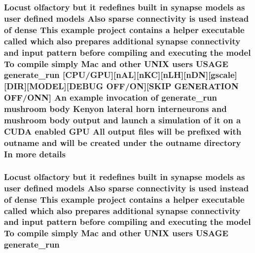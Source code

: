 \hypertarget{userproject_2MBody__userdef__project_2README_8txt_a8a530a3a68382c4ca5a4e7fe605b81b0}{
\subsubsection[{details}]{\setlength{\rightskip}{0pt plus 5cm}Locust olfactory but {\bf it} redefines built {\bf in} synapse models as user defined models Also sparse connectivity {\bf is} used instead of dense This example {\bf project} contains a helper executable called which also prepares additional synapse connectivity and input pattern before compiling and executing the {\bf model} To compile simply Mac and other U\+N\+I\+X users U\+S\+A\+G\+E {\bf generate\+\_\+run} \mbox{[}{\bf C\+P\+U}/{\bf G\+P\+U}\mbox{]}\mbox{[}n\+A\+L\mbox{]}\mbox{[}n\+K\+C\mbox{]}\mbox{[}n\+L\+H\mbox{]}\mbox{[}n\+D\+N\mbox{]}\mbox{[}gscale\mbox{]}\mbox{[}D\+I\+R\mbox{]}\mbox{[}M\+O\+D\+E\+L\mbox{]}\mbox{[}D\+E\+B\+U\+G O\+F\+F/O\+N\mbox{]}\mbox{[}S\+K\+I\+P G\+E\+N\+E\+R\+A\+T\+I\+O\+N O\+F\+F/O\+N\+N\mbox{]} An example invocation of {\bf generate\+\_\+run} mushroom body Kenyon lateral horn {\bf interneurons} and mushroom body output and launch a simulation of {\bf it} on a C\+U\+D\+A enabled {\bf G\+P\+U} All output files will be prefixed {\bf with} outname and will be created under the outname {\bf directory} In more details}}\label{userproject_2MBody__userdef__project_2README_8txt_a8a530a3a68382c4ca5a4e7fe605b81b0}
\hypertarget{userproject_2MBody__userdef__project_2README_8txt_a320a215d1e27b4de394be70e90d22863}{
\subsubsection[{generate\+\_\+run}]{\setlength{\rightskip}{0pt plus 5cm}Locust olfactory but {\bf it} redefines built {\bf in} synapse models as user defined models Also sparse connectivity {\bf is} used instead of dense This example {\bf project} contains a helper executable called which also prepares additional synapse connectivity and input pattern before compiling and executing the {\bf model} To compile simply Mac and other U\+N\+I\+X users U\+S\+A\+G\+E generate\+\_\+run}}\label{userproject_2MBody__userdef__project_2README_8txt_a320a215d1e27b4de394be70e90d22863}
